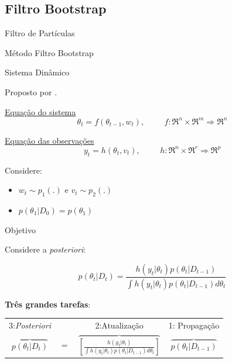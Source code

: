 \documentclass{beamer}
\begin{document}
\subsection{Filtro Bootstrap}
\begin{frame}{Filtro de Partículas}
    \begin{block}{Método}
      \Huge  Filtro Bootstrap
    \end{block}
\end{frame}

\begin{frame}{Sistema Dinâmico}

Proposto por \cite{gordon}.

\vspace{0.5cm}

\underline{Equação do sistema}
$$\theta_t = f(\theta_{t-1},w_t), \hspace{1cm}f: \Re^n \times \Re^m \Rightarrow \Re^n$$

\pause

\underline{Equação das observações}
$$y_t = h(\theta_{t} , v_t), \hspace{1cm} h: \Re^n\times \Re^r \Rightarrow \Re^p$$

\pause

Considere:
\begin{itemize}
\item $w_t \sim p_1(.)$ e $v_t\sim p_2(.)$
\item $p(\theta_1|D_0)=p(\theta_1)$
\end{itemize}

\end{frame}


\begin{frame}{Objetivo}

Considere a \textit{posteriori}:

\vspace{0.5cm}

$$
p(\theta_t|D_t)  = \frac{h(y_t|\theta_t)  p(\theta_t|D_{t-1}) }{\int h(y_t|\theta_t)p(\theta_t|D_{t-1})d \theta_t}
$$

\pause

\textbf{Três grandes tarefas}:
\vspace{0.5cm}

\begin{tabular}{cccc}
3:\textit{Posteriori} & & 2:Atualização & 1: Propagação \\
$\overbrace{p(\theta_t|D_t)} $ & $=$ & $\overbrace{\left[\frac{h(y_t|\theta_t)}{\int h(y_t|\theta_t)p(\theta_t|D_{t-1})d \theta_t}\right]} $& $\overbrace{p(\theta_t|D_{t-1})}$
\end{tabular}

\end{frame}
\end{document}
